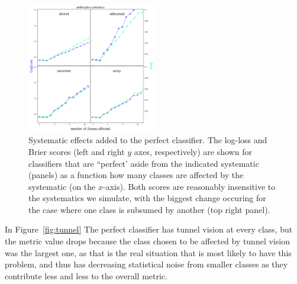 \begin{figure}
	\begin{center}
		\includegraphics[width=0.5\textwidth]{./fig/systematics_onlyperfect.png}
		\caption{Systematic effects added to the perfect classifier.
		The log-loss and Brier scores (left and right $y$ axes, respectively) are shown for classifiers that are ``perfect' aside from the indicated systematic (panels) as a function how many classes are affected by the systematic (on the $x$-axis).
		Both scores are reasonably insensitive to the systematics we simulate, with the biggest change occuring for the case where one class is subsumed by another (top right panel).\label{fig:cruise}}
	\end{center}
\end{figure}

In Figure~\ref{fig:tunnel}
The perfect classifier has tunnel vision at every class, but the metric value drops because the class chosen to be affected by tunnel vision was the largest one, as that is the real situation that is most likely to have this problem, and thus has decreasing statistical noise from smaller classes as they contribute less and less to the overall metric.

